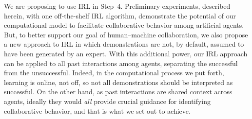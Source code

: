 We are proposing to use IRL in Step~4.  Preliminary experiments,
described herein, with one off-the-shelf IRL algorithm, demonstrate
the potential of our computational model to facilitate collaborative
behavior among artificial agents.
%
But, to better support our goal of human--machine collaboration, we
also propose a new approach to IRL in which demonstrations are not, by
default, assumed to have been generated by an expert.
%
With this additional power, our IRL approach can be applied to all
past interactions among agents, separating the successful from the
unsuccessful.
%
%
Indeed, in the computational process we put forth, learning is online,
not off, so not all demonstrations should be interpreted as
successful.  On the other hand, as past interactions are shared
context across agents, ideally they would \emph{all\/} provide crucial
guidance for identifying collaborative behavior, and that is what we set
out to achieve.

